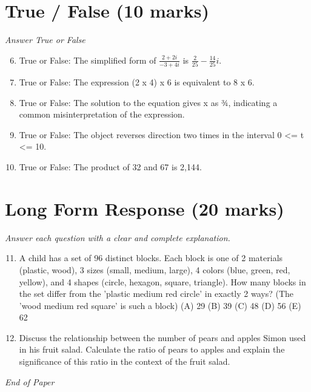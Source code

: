\documentclass[12pt]{article}
\begin{document}
\section*{True / False (10 marks)}
\textit{Answer True or False}
\begin{enumerate}[label=\arabic*.]
\setcounter{enumi}{5}
\item True or False: The simplified form of \( \frac{2+2 i}{-3+4 i} \) is \( \frac{2}{25} - \frac{14}{25}i \).
\item True or False: The expression (2 x 4) x 6 is equivalent to 8 x 6.
\item True or False: The solution to the equation gives x as ¾, indicating a common misinterpretation of the expression.
\item True or False: The object reverses direction two times in the interval 0 \textless{}= t \textless{}= 10.
\item True or False: The product of 32 and 67 is 2,144.
\end{enumerate}

\section*{Long Form Response (20 marks)}
\textit{Answer each question with a clear and complete explanation.}
\begin{enumerate}[label=\arabic*.]
\setcounter{enumi}{10}
\item A child has a set of 96 distinct blocks. Each block is one of 2 materials (plastic, wood), 3 sizes (small, medium, large), 4 colors (blue, green, red, yellow), and 4 shapes (circle, hexagon, square, triangle). How many blocks in the set differ from the 'plastic medium red circle' in exactly 2 ways? (The 'wood medium red square' is such a block) (A) 29 (B) 39 (C) 48 (D) 56 (E) 62
\item Discuss the relationship between the number of pears and apples Simon used in his fruit salad. Calculate the ratio of pears to apples and explain the significance of this ratio in the context of the fruit salad.
\end{enumerate}

\vfill
\noindent\textit{End of Paper}
\end{document}
